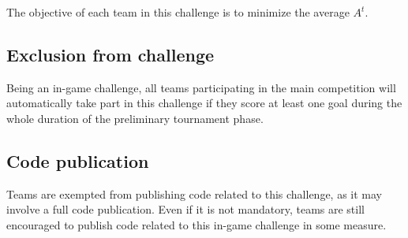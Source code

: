 The objective of each team in this challenge is to minimize the average $A^t$.

\subsection{Exclusion from challenge}
Being an in-game challenge, all teams participating in the main competition will automatically take part in this challenge if they score at least one goal during the whole duration of the preliminary tournament phase.

\subsection{Code publication}
Teams are exempted from publishing code related to this challenge, as it may involve a full code publication. Even if it is not mandatory, teams are still encouraged to publish code related to this in-game challenge in some measure.
